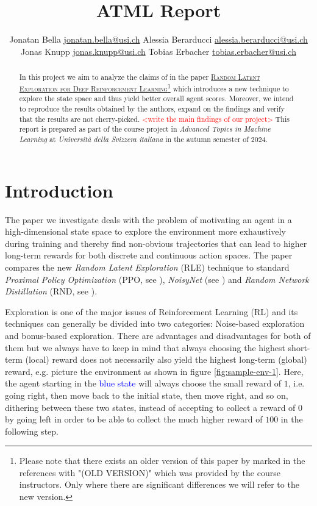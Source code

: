 \documentclass[10pt]{article} %
\title{ATML Report}
\author{%
  \name Jonatan Bella \email \href{mailto:jonatan.bella@usi.ch}{jonatan.bella@usi.ch}
  \AND
  \name Alessia Berarducci \email \href{mailto:alessia.berarducci@usi.ch}{alessia.berarducci@usi.ch}
  \AND
  \name Jonas Knupp \email \href{mailto:jonas.knupp@usi.ch}{jonas.knupp@usi.ch}
  \AND
  \name Tobias Erbacher \email \href{mailto:tobias.erbacher@usi.ch}{tobias.erbacher@usi.ch}
}
\begin{document}
\maketitle

\begin{abstract}
In this project we aim to analyze the claims of \cite{rle-paper} in the paper \href{https://arxiv.org/abs/2407.13755}{\textsc{Random Latent Exploration for Deep Reinforcement Learning}}\footnote{Please note that there exists an older version of this paper by \cite{rle-paper-old} marked in the references with "(OLD VERSION)" which was provided by the course instructors. Only where there are significant differences we will refer to the new version.} which introduces a new technique to explore the state space and thus yield better overall agent scores. Moreover, we intend to reproduce the results obtained by the authors, expand on the findings and verify that the results are not cherry-picked. \textcolor{red}{<write the main findings of our project>} This report is prepared as part of the course project in \textit{Advanced Topics in Machine Learning} at \textit{Università della Svizzera italiana} in the autumn semester of 2024.
\end{abstract}


\section{Introduction}
\noindent The paper we investigate deals with the problem of motivating an agent in a high-dimensional state space to explore the environment more exhaustively during training and thereby find non-obvious trajectories that can lead to higher long-term rewards for both discrete and continuous action spaces. The paper compares the new \textit{Random Latent Exploration} (RLE) technique to standard \textit{Proximal Policy Optimization} (PPO, see \cite{ppo-paper}), \textit{NoisyNet} (see \cite{noisynet-paper}) and \textit{Random Network Distillation} (RND, see \cite{rnd-paper}).

\noindent Exploration is one of the major issues of Reinforcement Learning (RL) and its techniques can generally be divided into two categories: Noise-based exploration and bonus-based exploration. There are advantages and disadvantages for both of them but we always have to keep in mind that always choosing the highest short-term (local) reward does not necessarily also yield the highest long-term (global) reward, e.g. picture the environment as shown in figure \ref{fig:sample-env-1}. Here, the agent starting in the \textcolor{blue}{blue state} will always choose the small reward of $1$, i.e. going right, then move back to the initial state, then move right, and so on, dithering between these two states, instead of accepting to collect a reward of $0$ by going left in order to be able to collect the much higher reward of $100$ in the following step.
\end{document}
